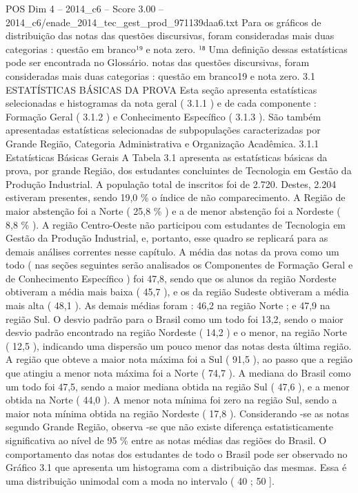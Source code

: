 \begin{textsample}{POS Dim 4 – 2014\_c6 – Score 3.00 – 2014\_c6/enade\_2014\_tec\_gest\_prod\_971139daa6.txt}
Para os gráficos de distribuição das notas das questões discursivas, foram consideradas mais duas categorias : questão em branco¹⁹ e nota zero. ¹⁸ Uma definição dessas estatísticas pode ser encontrada no Glossário. notas das questões discursivas, foram consideradas mais duas categorias : questão em branco19 e nota zero. 3.1 ESTATÍSTICAS BÁSICAS DA PROVA Esta seção apresenta estatísticas selecionadas e histogramas da nota geral ( 3.1.1 ) e de cada componente : Formação Geral ( 3.1.2 ) e Conhecimento Específico ( 3.1.3 ).
São também apresentadas estatísticas selecionadas de subpopulações caracterizadas por Grande Região, Categoria Administrativa e Organização Acadêmica. 3.1.1 Estatísticas Básicas Gerais A Tabela 3.1 apresenta as estatísticas básicas da prova, por grande Região, dos estudantes concluintes de Tecnologia em Gestão da Produção Industrial.
A população total de inscritos foi de 2.720.
Destes, 2.204 estiveram presentes, sendo 19,0 \% o índice de não comparecimento.
A Região de maior abstenção foi a Norte ( 25,8 \% ) e a de menor abstenção foi a Nordeste ( 8,8 \% ).
A região Centro-Oeste não participou com estudantes de Tecnologia em Gestão da Produção Industrial, e, portanto, esse quadro se replicará para as demais análises correntes nesse capítulo.
A média das notas da prova como um todo ( nas seções seguintes serão analisados os Componentes de Formação Geral e de Conhecimento Específico ) foi 47,8, sendo que os alunos da região Nordeste obtiveram a média mais baixa ( 45,7 ), e os da região Sudeste obtiveram a média mais alta ( 48,1 ).
As demais médias foram : 46,2 na região Norte ; e 47,9 na região Sul.
O desvio padrão para o Brasil como um todo foi 13,2, sendo o maior desvio padrão encontrado na região Nordeste ( 14,2 ) e o menor, na região Norte ( 12,5 ), indicando uma dispersão um pouco menor das notas desta última região.
A região que obteve a maior nota máxima foi a Sul ( 91,5 ), ao passo que a região que atingiu a menor nota máxima foi a Norte ( 74,7 ).
A mediana do Brasil como um todo foi 47,5, sendo a maior mediana obtida na região Sul ( 47,6 ), e a menor obtida na Norte ( 44,0 ).
A menor nota mínima foi zero na região Sul, sendo a maior nota mínima obtida na região Nordeste ( 17,8 ).
Considerando -se as notas segundo Grande Região, observa -se que não existe diferença estatisticamente significativa ao nível de 95 \% entre as notas médias das regiões do Brasil.
O comportamento das notas dos estudantes de todo o Brasil pode ser observado no Gráfico 3.1 que apresenta um histograma com a distribuição das mesmas.
Essa é uma distribuição unimodal com a moda no intervalo ( 40 ; 50 ].

\end{textsample}
